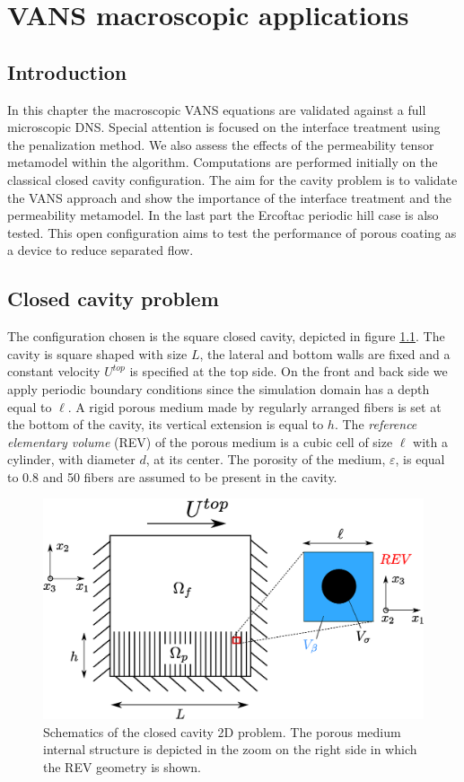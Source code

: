 \chapter{VANS macroscopic applications}


\section{Introduction}

In this chapter the macroscopic VANS equations are validated against a full microscopic DNS. Special attention is focused on the interface treatment using the penalization method. We also assess the effects of the permeability tensor metamodel within the algorithm. Computations are performed initially on the classical closed cavity configuration. The aim for the cavity problem is to validate the VANS approach and show the importance of the interface treatment and the permeability metamodel. In the last part the Ercoftac periodic hill case is also tested. This open configuration aims to test the performance of porous coating as a device to reduce separated flow.


\section{Closed cavity problem}
The configuration chosen is the square closed cavity, depicted in figure \ref{fig:geom}.
The cavity is square shaped with size $L$, the lateral and bottom walls are fixed and a constant velocity $U^{top}$ is specified at the top side.
On the front and back side we apply periodic boundary conditions since the simulation domain has a depth equal to $\ell$.
A rigid porous medium made by regularly arranged fibers is set at the bottom of the cavity, its vertical extension is equal to $h$.
The \textit{reference elementary volume} (REV) of the porous medium is a cubic cell of size $\ell$ with a cylinder, with diameter $d$, at its center.
The porosity of the medium, $\varepsilon$, is equal to 0.8 and 50 fibers are assumed to be present in the cavity.

\begin{figure}[h]
\centering
\includegraphics[width=0.7\linewidth]{chapter_5/figure/cavity_draw.eps}
\caption{Schematics of the closed cavity 2D problem. The porous medium internal structure is depicted in the zoom on the right side in which the REV geometry is shown.}
\label{fig:geom}
\end{figure}

